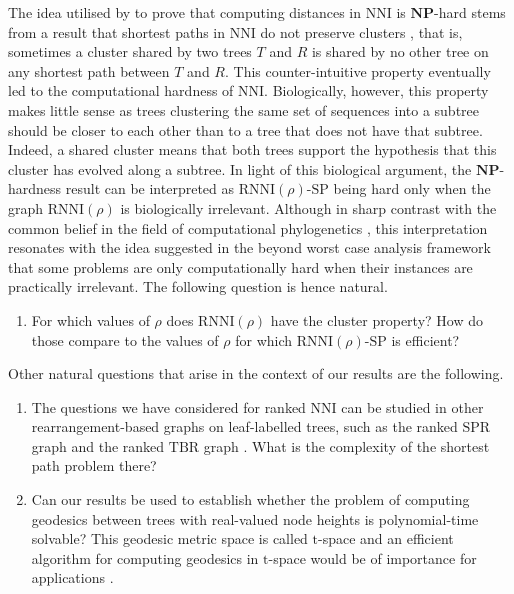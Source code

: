 \documentclass[11pt]{amsart}
\newcommand{\rnni}{\mathrm{RNNI}}
\newcommand{\nni}{\mathrm{NNI}}
\newcommand{\spr}{\mathrm{SPR}}
\newcommand{\tbr}{\mathrm{TBR}}
\newcommand{\np}{\mathbf{NP}}
\newcommand{\decprob}[1]{\rnni(#1)\text{-}\mathrm{SP}}
\begin{document}
The idea utilised by \textcite{Dasgupta2000-xa} to prove that computing distances in $\nni$ is $\np$-hard stems from a result that shortest paths in $\nni$ do not preserve clusters \autocite{Li1996-zw}, that is, sometimes a cluster shared by two trees $T$ and $R$ is shared by no other tree on any shortest path between $T$ and $R$.
This counter-intuitive property eventually led to the computational hardness of $\nni$.
Biologically, however, this property makes little sense as trees clustering the same set of sequences into a subtree should be closer to each other than to a tree that does not have that subtree.
Indeed, a shared cluster means that both trees support the hypothesis that this cluster has evolved along a subtree.
In light of this biological argument, the $\np$-hardness result can be interpreted as $\decprob{\rho}$ being hard only when the graph $\rnni(\rho)$ is biologically irrelevant.
Although in sharp contrast with the common belief in the field of computational phylogenetics \autocite{Whidden2018-fw}, this interpretation resonates with the idea suggested in the beyond worst case analysis framework \autocite{Roughgarden2019-to} that some problems are only computationally hard when their instances are practically irrelevant.
The following question is hence natural.
\begin{enumerate}
\item For which values of $\rho$ does $\rnni(\rho)$ have the cluster property?
How do those compare to the values of $\rho$ for which $\decprob{\rho}$ is efficient?
\end{enumerate}
Other natural questions that arise in the context of our results are the following.
\begin{enumerate}
\addtocounter{enumi}{1}
\item The questions we have considered for ranked $\nni$ can be studied in other rearrangement-based graphs on leaf-labelled trees, such as the ranked $\spr$ graph and the ranked $\tbr$ graph \autocite{Semple2003-nj}.
What is the complexity of the shortest path problem there?

\item Can our results be used to establish whether the problem of computing geodesics between trees with real-valued node heights is polynomial-time solvable?
This geodesic metric space is called $\mathrm t$-space and an efficient algorithm for computing geodesics in $\mathrm t$-space would be of importance for applications \autocite{Gavryushkin2016-uu}.
\end{enumerate}

\printbibliography
\end{document}
